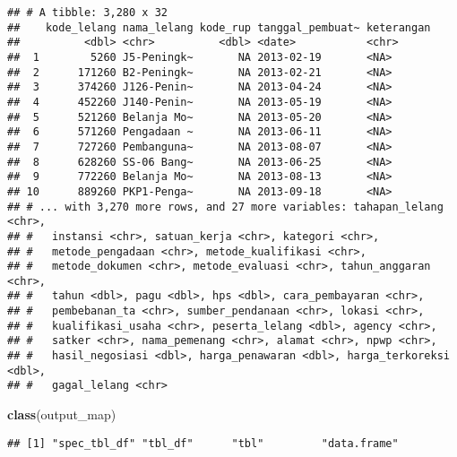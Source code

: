 \documentclass[]{article}
\newenvironment{Shaded}{\begin{snugshade}}{\end{snugshade}}
\newcommand{\KeywordTok}[1]{\textcolor[rgb]{0.13,0.29,0.53}{\textbf{#1}}}
\newcommand{\NormalTok}[1]{#1}
\begin{document}
\begin{verbatim}
## # A tibble: 3,280 x 32
##    kode_lelang nama_lelang kode_rup tanggal_pembuat~ keterangan
##          <dbl> <chr>          <dbl> <date>           <chr>     
##  1        5260 J5-Peningk~       NA 2013-02-19       <NA>      
##  2      171260 B2-Peningk~       NA 2013-02-21       <NA>      
##  3      374260 J126-Penin~       NA 2013-04-24       <NA>      
##  4      452260 J140-Penin~       NA 2013-05-19       <NA>      
##  5      521260 Belanja Mo~       NA 2013-05-20       <NA>      
##  6      571260 Pengadaan ~       NA 2013-06-11       <NA>      
##  7      727260 Pembanguna~       NA 2013-08-07       <NA>      
##  8      628260 SS-06 Bang~       NA 2013-06-25       <NA>      
##  9      772260 Belanja Mo~       NA 2013-08-13       <NA>      
## 10      889260 PKP1-Penga~       NA 2013-09-18       <NA>      
## # ... with 3,270 more rows, and 27 more variables: tahapan_lelang <chr>,
## #   instansi <chr>, satuan_kerja <chr>, kategori <chr>,
## #   metode_pengadaan <chr>, metode_kualifikasi <chr>,
## #   metode_dokumen <chr>, metode_evaluasi <chr>, tahun_anggaran <chr>,
## #   tahun <dbl>, pagu <dbl>, hps <dbl>, cara_pembayaran <chr>,
## #   pembebanan_ta <chr>, sumber_pendanaan <chr>, lokasi <chr>,
## #   kualifikasi_usaha <chr>, peserta_lelang <dbl>, agency <chr>,
## #   satker <chr>, nama_pemenang <chr>, alamat <chr>, npwp <chr>,
## #   hasil_negosiasi <dbl>, harga_penawaran <dbl>, harga_terkoreksi <dbl>,
## #   gagal_lelang <chr>
\end{verbatim}

\begin{Shaded}
\begin{Highlighting}[]
\KeywordTok{class}\NormalTok{(output_map)}
\end{Highlighting}
\end{Shaded}

\begin{verbatim}
## [1] "spec_tbl_df" "tbl_df"      "tbl"         "data.frame"
\end{verbatim}
\end{document}
